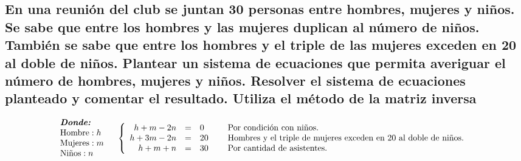\documentclass[10pt, a4paper]{article}
\begin{document}
\subsection{En una reunión del club se juntan 30 personas entre hombres, mujeres y niños. Se sabe que entre los hombres y las mujeres duplican al número de niños. También se sabe que entre los hombres y el triple de las mujeres exceden en 20 al doble de niños. Plantear un sistema de ecuaciones que permita averiguar el número de hombres, mujeres y niños. Resolver el sistema de ecuaciones planteado y comentar el resultado. Utiliza el método de la matriz inversa}
\vspace{-0.5cm}
\begin{align*}
  &\begin{array}{l}
      \textit{\textbf{Donde:}}\\
      \text{Hombre}: h\\
      \text{Mujeres}: m\\
      \text{Niños}: n\\
  \end{array}
  \quad
  \left\{
  \begin{array}{rcl}
    h + m -2n &= &0\\
    h + 3m -2n &= &20\\
    h + m + n &= &30
  \end{array}
  \right.
  \quad
  \begin{array}{l}
    \text{Por condición con niños.}\\
    \text{Hombres y el triple de mujeres exceden en 20 al doble de niños.}\\
    \text{Por cantidad de asistentes.}
  \end{array}
\end{align*}
\end{document}
